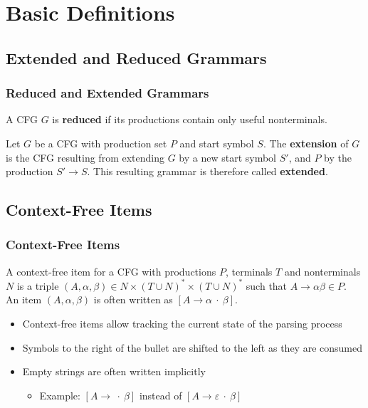 \documentclass{beamer}
\newcommand{\concept}[1]{\textbf{#1}}
\newcommand{\cfitem}[3]{\ensuremath{{[#1 \to #2 \:\cdot\: #3]}}}
\newcommand{\syms}{\ensuremath{{(T \cup N)}^*}}
\begin{document}
\section{Basic Definitions}

\subsection{Extended and Reduced Grammars}

\begin{frame}
  \frametitle{Reduced and Extended Grammars}
  \begin{definition}
    A CFG $G$ is \concept{reduced} if its productions contain only useful
    nonterminals.
  \end{definition}
  \begin{definition}
    Let $G$ be a CFG with production set $P$ and start symbol $S$.
    The \concept{extension} of $G$ is the CFG resulting from extending $G$ by a
    new start symbol $S'$, and $P$ by the production $S' \rightarrow S$. This resulting
    grammar is therefore called \concept{extended}.
  \end{definition}
\end{frame}

\subsection{Context-Free Items}

\begin{frame}
  \frametitle{Context-Free Items}
  \begin{definition}
    A context-free item for a CFG with productions $P$, terminals $T$ and nonterminals
    $N$ is a triple 
    $(A, \alpha, \beta) \in N \times \syms \times \syms$ such that
    $A \rightarrow \alpha \beta \in P$.\\
    An item $(A, \alpha, \beta)$ is often written as \cfitem{A}{\alpha}{\beta}.
  \end{definition}
  \begin{itemize}
    \item Context-free items allow tracking the current state of the parsing process
    \item Symbols to the right of the bullet are shifted to the left as they are consumed
    \item Empty strings are often written implicitly
    \begin{itemize}
      \item Example: \cfitem{A}{}{\beta} instead of \cfitem{A}{\varepsilon}{\beta}
    \end{itemize}
  \end{itemize}
\end{frame}
\end{document}

